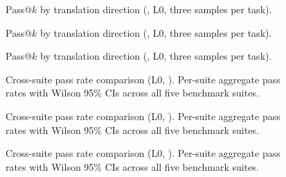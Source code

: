 %

\begin{figure}[t]
\centering

\caption{Pass@$k$ by translation direction (\qwenshort{}, L0, three samples per task).}
\label{fig:pass-at-k-qwen}
\end{figure}

\begin{figure}[t]
\centering

\caption{Pass@$k$ by translation direction (\gptnew{}, L0, three samples per task).}
\label{fig:pass-at-k-gpt54}
\end{figure}

\begin{figure}[t]
\centering

\caption{Pass@$k$ by translation direction (\codex{}, L0, three samples per task).}
\label{fig:pass-at-k-codex}
\end{figure}

\begin{figure}[t]
\centering

\caption{Cross-suite pass rate comparison (L0, \qwenshort{}). Per-suite aggregate pass rates with Wilson 95\% CIs across all five benchmark suites.}
\label{fig:cross-suite-qwen}
\end{figure}

\begin{figure}[t]
\centering

\caption{Cross-suite pass rate comparison (L0, \gptnew{}). Per-suite aggregate pass rates with Wilson 95\% CIs across all five benchmark suites.}
\label{fig:cross-suite-gpt54}
\end{figure}

\begin{figure}[t]
\centering

\caption{Cross-suite pass rate comparison (L0, \codex{}). Per-suite aggregate pass rates with Wilson 95\% CIs across all five benchmark suites.}
\label{fig:cross-suite-codex}
\end{figure}

